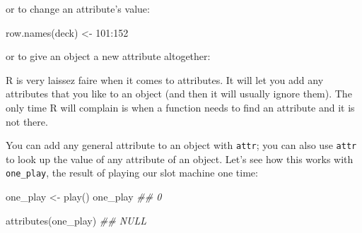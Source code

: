 \documentclass[
  letterpaper,
  DIV=11,
  numbers=noendperiod]{scrbook}
\newenvironment{Shaded}{\begin{snugshade}}{\end{snugshade}}
\newcommand{\DecValTok}[1]{\textcolor[rgb]{0.68,0.00,0.00}{#1}}
\newcommand{\DocumentationTok}[1]{\textcolor[rgb]{0.37,0.37,0.37}{\textit{#1}}}
\newcommand{\FunctionTok}[1]{\textcolor[rgb]{0.28,0.35,0.67}{#1}}
\newcommand{\NormalTok}[1]{\textcolor[rgb]{0.00,0.23,0.31}{#1}}
\newcommand{\OtherTok}[1]{\textcolor[rgb]{0.00,0.23,0.31}{#1}}
\newcommand{\SpecialCharTok}[1]{\textcolor[rgb]{0.37,0.37,0.37}{#1}}
\newcommand{\StringTok}[1]{\textcolor[rgb]{0.13,0.47,0.30}{#1}}
\begin{document}
or to change an attribute's value:

\begin{Shaded}
\begin{Highlighting}[]
\FunctionTok{row.names}\NormalTok{(deck) }\OtherTok{\textless{}{-}} \DecValTok{101}\SpecialCharTok{:}\DecValTok{152}
\end{Highlighting}
\end{Shaded}

or to give an object a new attribute altogether:

\begin{Shaded}
\end{Shaded}

R is very laissez faire when it comes to attributes. It will let you add
any attributes that you like to an object (and then it will usually
ignore them). The only time R will complain is when a function needs to
find an attribute and it is not there.

You can add any general attribute to an object with \texttt{attr}; you
can also use \texttt{attr} to look up the value of any attribute of an
object. Let's see how this works with \texttt{one\_play}, the result of
playing our slot machine one time:

\begin{Shaded}
\begin{Highlighting}[]
\NormalTok{one\_play }\OtherTok{\textless{}{-}} \FunctionTok{play}\NormalTok{()}
\NormalTok{one\_play}
\DocumentationTok{\#\# 0}

\FunctionTok{attributes}\NormalTok{(one\_play)}
\DocumentationTok{\#\# NULL}
\end{Highlighting}
\end{Shaded}
\end{document}
